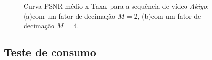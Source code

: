 \begin{figure}[H]
	\centering
	\caption{Curva PSNR médio x Taxa, para a sequência de vídeo \textit{Akiyo}: (a)com um fator de decimação $M$ = 2, (b)com um fator de decimação $M$ = 4.}
	\label{fig:akiyoh264}
\end{figure}
\clearpage




\subsection{Teste de consumo}

